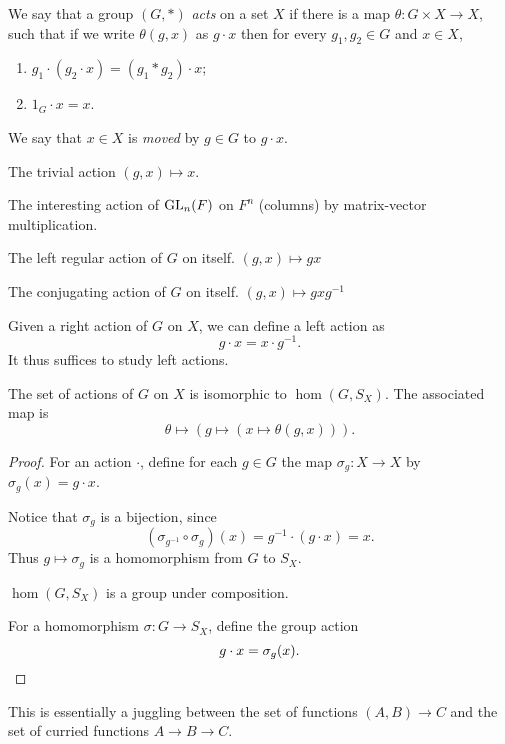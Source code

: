 
\begin{definition*}[Action] \label{def:group:action}
    We say that a group $(G, *)$ \emph{acts} on a set $X$ if there is a map
    $\theta\colon G \times X \to X$, such that if we write $\theta(g, x)$
    as $g \cdot x$ then for every $g_1, g_2 \in G$ and $x \in X$,
    \begin{enumerate}
        \item $g_1 \cdot (g_2 \cdot x) = (g_1 * g_2) \cdot x$;
        \item $1_G \cdot x = x$.
    \end{enumerate}
    We say that $x \in X$ is \emph{moved} by $g \in G$ to $g \cdot x$.
\end{definition*}
\begin{examples}
    \item The trivial action $(g, x) \mapsto x$.
    \item The interesting action of $\operatorname{GL}_n(F)$ on $F^n$ (columns)
        by matrix-vector multiplication.
    \item The left regular action of $G$ on itself.
        $(g, x) \mapsto gx$
    \item The conjugating action of $G$ on itself.
        $(g, x) \mapsto gxg^{-1}$
\end{examples}
\begin{remark}
    Given a right action of $G$ on $X$, we can define a left action as \[
        g \cdot x = x \cdot g^{-1}.
    \] It thus suffices to study left actions.
\end{remark}

\begin{proposition}
    The set of actions of $G$ on $X$ is isomorphic to $\hom(G, S_X)$.
    The associated map is \[
        \theta \mapsto (g \mapsto (x \mapsto \theta(g, x))).
    \]
\end{proposition}
\begin{proof}
    For an action $\cdot$, define for each $g \in G$ the map
    $\sigma_g\colon X \to X$ by $\sigma_g(x) = g \cdot x$.

    Notice that $\sigma_g$ is a bijection, since \[
        (\sigma_{g^{-1}} \circ \sigma_g)(x) = g^{-1} \cdot (g \cdot x) = x.
    \] Thus $g \mapsto \sigma_g$ is a homomorphism from $G$ to $S_X$.

    $\hom(G, S_X)$ is a group under composition.

    For a homomorphism $\sigma\colon G \to S_X$, define the group action \[
        g \cdot x = \sigma_g(x). \qedhere
    \]
\end{proof}
\begin{remark}
    This is essentially a juggling between the set of functions
    $(A, B) \to C$ and the set of curried functions $A \to B \to C$.
\end{remark}

